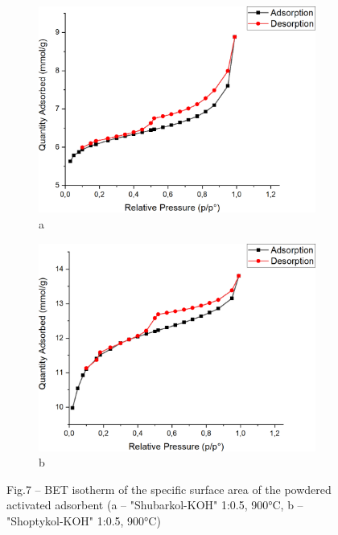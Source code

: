 \begin{figure}[H]
    \centering
    \begin{subfigure}[b]{0.45\textwidth}
        \centering
        \includegraphics[width=\textwidth]{media/chem2/image24}
        \caption*{a}
    \end{subfigure}
    \begin{subfigure}[b]{0.45\textwidth}
        \centering
        \includegraphics[width=\textwidth]{media/chem2/image25}
        \caption*{b}
    \end{subfigure}
    \caption*{Fig.7 -- BET isotherm of the specific surface area of the powdered activated adsorbent (a -- "Shubarkol-KOH" 1:0.5, 900°C, b -- "Shoptykol-KOH" 1:0.5, 900°C)}
\end{figure}

